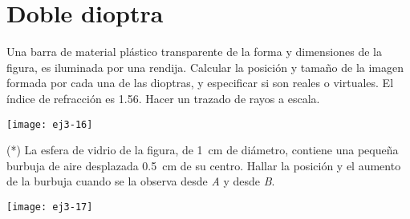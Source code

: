 \section*{Doble dioptra}

\item 
\begin{minipage}[t][3cm]{0.55\textwidth}
Una barra de material plástico transparente de la forma y dimensiones de la figura, es iluminada por una rendija.
Calcular la posición y tamaño de la imagen formada por cada una de las dioptras, y especificar si son reales o virtuales.
El índice de refracción es \num{1.56}.
Hacer un trazado de rayos a escala.
\end{minipage}
\begin{minipage}[c][0.4cm][t]{0.4\textwidth}
	\texttt{[image: ej3-16]}
\end{minipage}



\item
\begin{minipage}[t][1.5cm]{0.55\textwidth}
(*) La esfera de vidrio de la figura, de \SI{1}{\centi\metre} de diámetro, contiene una pequeña burbuja de aire desplazada \SI{0.5}{\centi\metre} de su centro.
Hallar la posición y el aumento de la burbuja cuando se la observa desde \emph{A} y desde \emph{B}.
\end{minipage}
\begin{minipage}[c][0.8cm][t]{0.4\textwidth}
	\texttt{[image: ej3-17]}
\end{minipage}
